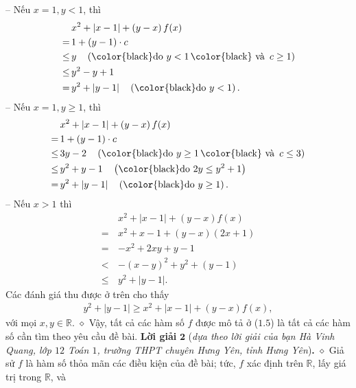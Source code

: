 \begin{multicols}{2}
	-- Nếu $x = 1, y < 1$, thì
	\begin{align*}
			&{x^2} + |x - 1| + \left( {y - x} \right)f(x) \\
			=\,& 1 + \left( {y - 1} \right) \cdot c\\
			 \le\,& y \quad\left( {{\text{\color{black}do }}y < 1{\,\text{\color{black} và }}\,c \ge 1} \right)\\
			 \le\,& {y^2} - y + 1\\
			 = \,&{y^2} + \left| {y - 1} \right|\quad\left( {{\text{\color{black}do }}y < 1} \right).
	\end{align*}
	-- Nếu $x = 1, y \ge 1$, thì
	\begin{align*}
			&{x^2} + |x - 1| + \left( {y - x} \right)f(x) \\
			= \,&1 + \left( {y - 1} \right) \cdot c\\
			 \le\,& 3y - 2\quad\left( {{\text{\color{black}do }}y \ge 1{\,\text{\color{black} và }}\,c \le 3} \right)\\
			 \le\,& {y^2} + y - 1\quad\left( {{\text{\color{black}do }}2y \le {y^2} + 1} \right)\\
			 = \,&{y^2} + \left| {y - 1} \right|\quad\left( {{\text{\color{black}do }}y \ge 1} \right).
	\end{align*}
	-- Nếu $x > 1$ thì
	\begin{align*}
			&{x^2} + |x - 1| + \left( {y - x} \right)f(x) \\
			= \,&{x^2} + x - 1 + \left( {y - x} \right)\left( {2x + 1} \right)\\
			 = \,& - {x^2} + 2xy + y - 1\\
			 <  \,&- {\left( {x - y} \right)^2} + {y^2} + \left( {y - 1} \right)\\
			 \le \,&{y^2} + \left| {y - 1} \right|.
	\end{align*}
	Các đánh giá thu được ở trên cho thấy
	\begin{align*}
		{y^2} + |y - 1| \ge {x^2} + |x - 1| + \left( {y - x} \right)f(x),
	\end{align*}
	với mọi  $x,y \in \mathbb{R}$.
	\vskip 0.05cm
	$\diamond$ Vậy, tất cả các hàm số $f$  được mô tả ở ($1.5$) là tất cả các hàm số cần tìm theo yêu cầu đề bài.
	\vskip 0.05cm
	\textbf{\color{thachthuctoanhoc}Lời giải} $\pmb{2}$ (\textit{dựa theo lời giải của bạn Hà Vinh Quang, lớp $12$ Toán $1$, trường THPT chuyên Hưng Yên, tỉnh Hưng Yên})\textbf{\color{thachthuctoanhoc}.}
	\vskip 0.05cm
	$\diamond$ Giả sử  $f$ là hàm số thỏa mãn các điều kiện của đề bài; tức, $f$ xác định trên  $\mathbb{R}$, lấy giá trị trong  $\mathbb{R}$, và

\end{multicols}
